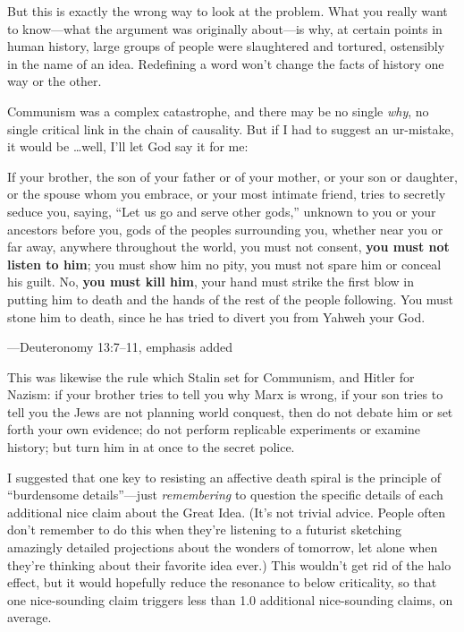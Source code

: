 {
 But this is exactly the wrong way to look at the problem. What you
really want to know---what the argument was originally about---is why,
at certain points in human history, large groups of people were
slaughtered and tortured, ostensibly in the name of an idea. Redefining
a word won't change the facts of history one way or the
other.}

{
 Communism was a complex catastrophe, and there may be no single
\textit{why}, no single critical link in the chain of causality. But if
I had to suggest an ur-mistake, it would be \ldots well,
I'll let God say it for me:}

{
 If your brother, the son of your father or of your mother, or your
son or daughter, or the spouse whom you embrace, or your most intimate
friend, tries to secretly seduce you, saying, ``Let us
go and serve other gods,'' unknown to you or your
ancestors before you, gods of the peoples surrounding you, whether near
you or far away, anywhere throughout the world, you must not consent,
\textbf{you must not listen to him}; you must show him no pity, you
must not spare him or conceal his guilt. No, \textbf{you must kill
him}, your hand must strike the first blow in putting him to death and
the hands of the rest of the people following. You must stone him to
death, since he has tried to divert you from Yahweh your God.}

{\raggedleft
 {}---Deuteronomy 13:7--11, emphasis added
\par}


\bigskip

{
 This was likewise the rule which Stalin set for Communism, and
Hitler for Nazism: if your brother tries to tell you why Marx is wrong,
if your son tries to tell you the Jews are not planning world conquest,
then do not debate him or set forth your own evidence; do not perform
replicable experiments or examine history; but turn him in at once to
the secret police.}

{
 I suggested that one key to resisting an affective death spiral is
the principle of ``burdensome
details''---just \textit{remembering} to question the
specific details of each additional nice claim about the Great Idea.
(It's not trivial advice. People often
don't remember to do this when they're
listening to a futurist sketching amazingly detailed projections about
the wonders of tomorrow, let alone when they're
thinking about their favorite idea ever.) This wouldn't
get rid of the halo effect, but it would hopefully reduce the resonance
to below criticality, so that one nice-sounding claim triggers less
than 1.0 additional nice-sounding claims, on average.}

